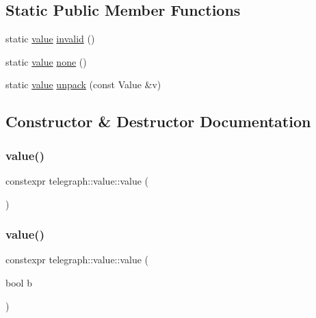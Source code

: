 \subsection*{Static Public Member Functions}
\begin{DoxyCompactItemize}
\item 
static \hyperlink{classtelegraph_1_1value}{value} \hyperlink{classtelegraph_1_1value_a68b0f771058facdf968ff62de354b881}{invalid} ()
\item 
static \hyperlink{classtelegraph_1_1value}{value} \hyperlink{classtelegraph_1_1value_a3ca25fc3c78659ae5f29da61b2583e2c}{none} ()
\item 
static \hyperlink{classtelegraph_1_1value}{value} \hyperlink{classtelegraph_1_1value_abe64620f91527a2b36310c4ace2a2790}{unpack} (const Value \&v)
\end{DoxyCompactItemize}


\subsection{Constructor \& Destructor Documentation}
\mbox{\label{classtelegraph_1_1value_a0d68e7b123903adee0527771007ef9bb}} 
\subsubsection{\texorpdfstring{value()}{value()}\hspace{0.1cm}{\footnotesize\ttfamily [1/14]}}
{\footnotesize\ttfamily constexpr telegraph\+::value\+::value (\begin{DoxyParamCaption}{ }\end{DoxyParamCaption})\hspace{0.3cm}{\ttfamily [inline]}}

\mbox{\label{classtelegraph_1_1value_acdf151d4a74fc89dbf713b6a3bc010e7}} 
\subsubsection{\texorpdfstring{value()}{value()}\hspace{0.1cm}{\footnotesize\ttfamily [2/14]}}
{\footnotesize\ttfamily constexpr telegraph\+::value\+::value (\begin{DoxyParamCaption}\item[{bool}]{b }\end{DoxyParamCaption})\hspace{0.3cm}{\ttfamily [inline]}}

